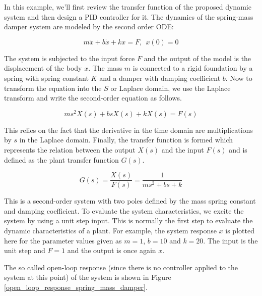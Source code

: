 In this example, we'll first review the transfer function of the proposed dynamic system and then design a PID controller for it. The dynamics of the spring-mass damper system  are modeled by the second order ODE:

\begin{equation}
m\ddot{x} + b\dot{x} + kx = F, ~~ x(0) = 0
\end{equation}

 The system is subjected to the input force $F$ and the output of the model is the displacement of the body $x$. The mass $m$ is connected to a rigid foundation by a spring with spring constant $K$ and a damper with damping coefficient $b$. Now to transform the equation into the $S$ or Laplace domain, we use the Laplace transform and write the second-order equation as follows. 

\begin{equation}
ms^2X(s) + bsX(s) + kX(s) = F(s) 
\end{equation}

This relies on the fact that the derivative in the time domain are multiplications by $s$ in the Laplace domain. Finally, the transfer function is formed which represents the relation between the output $X(s)$ and the input $F(s)$ and is defined as the plant transfer function $G(s)$. 


\begin{equation}
G(s) = \frac{X(s)}{F(s)} = \frac{1}{ms^2 + bs + k} 
\end{equation}

This is a second-order system with two poles defined by the mass spring constant and damping coefficient. To evaluate the system characteristics, we excite the system by using a unit step input. This is normally the first step to evaluate the dynamic characteristics of a plant. For example, the system response $x$ is plotted here for the parameter values given as $m=1$, $b =10$ and $k = 20$. The input is the unit step and $F=1$ and the output is once again $x$. 

The so called open-loop response (since there is no controller applied to the system at this point) of the system
is shown in Figure \ref{open_loop_response_spring_mass_damper}. 

